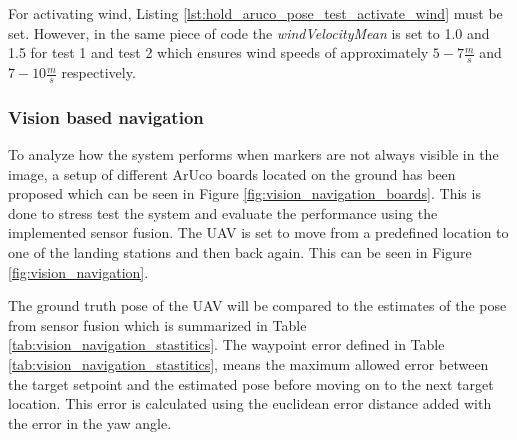 \documentclass[../Head/report.tex]{subfiles}
\begin{document}
For activating wind, Listing \ref{lst:hold_aruco_pose_test_activate_wind} must be set. However, in the same piece of code the \textit{windVelocityMean} is set to 1.0 and 1.5 for test 1 and test 2 which ensures wind speeds of approximately $5-7 \frac{m}{s}$ and $7-10 \frac{m}{s}$ respectively. 

\subsubsection{Vision based navigation}
\label{sec:vision_based_navigation}

To analyze how the system performs when markers are not always visible in the image, a setup of different ArUco boards located on the ground has been proposed which can be seen in Figure \ref{fig:vision_navigation_boards}. This is done to stress test the system and evaluate the performance using the implemented sensor fusion. The UAV is set to move from a predefined location to one of the landing stations and then back again. This can be seen in Figure \ref{fig:vision_navigation}. 

The ground truth pose of the UAV will be compared to the estimates of the pose from sensor fusion which is summarized in Table \ref{tab:vision_navigation_stastitics}. The waypoint error defined in Table \ref{tab:vision_navigation_stastitics}, means the maximum allowed error between the target setpoint and the estimated pose before moving on to the next target location. This error is calculated using the euclidean error distance added with the error in the yaw angle.   
\end{document}
